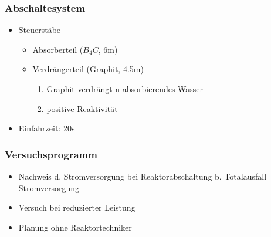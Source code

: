 \documentclass[12pt]{article}
\begin{document}
\subsubsection{Abschaltesystem}
\begin{itemize}
	\item Steuerstäbe
		\begin{itemize}
			\item Absorberteil (\(B_4C\), 6m)
			\item Verdrängerteil (Graphit, 4.5m)
				\begin{enumerate}[label = \textrightarrow]
					\item Graphit verdrängt n-absorbierendes Wasser
					\item positive Reaktivität
				\end{enumerate}
		\end{itemize}
	\item Einfahrzeit: 20s
\end{itemize}

\subsubsection{Versuchsprogramm}
\begin{itemize}
	\item Nachweis d. Stromversorgung bei Reaktorabschaltung b. Totalausfall Stromversorgung
	\item Versuch bei reduzierter Leistung
	\item Planung ohne Reaktortechniker
\end{itemize}
\end{document}
